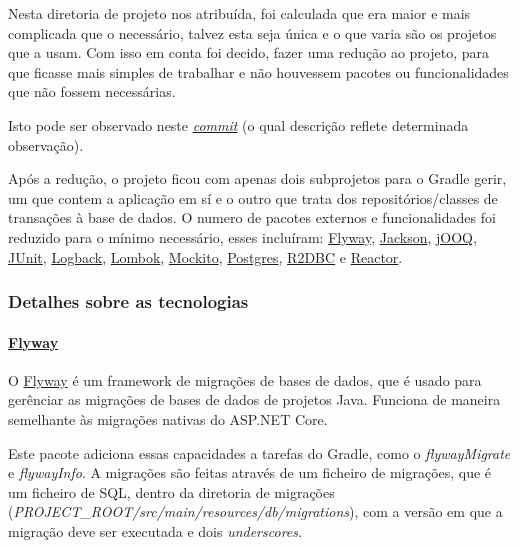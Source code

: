 Nesta diretoria de projeto nos atribuída, foi calculada que era maior e mais complicada que o necessário, talvez esta seja única e o que varia são os projetos que a usam. Com isso em conta foi decido, fazer uma redução ao projeto, para que ficasse mais simples de trabalhar e não houvessem pacotes ou funcionalidades que não fossem necessárias.

Isto pode ser observado neste \href{https://github.com/CatKinKitKat/MicronautJooqPostgresREST/commit/3c71d709599662436ae13cf9dcf609a5ca5464e3}{\textit{commit}} (o qual descrição reflete determinada observação).

Após a redução, o projeto ficou com apenas dois subprojetos para o Gradle gerir, um que contem a aplicação em sí e o outro que trata dos repositórios/classes de transações à base de dados. O numero de pacotes externos e funcionalidades foi reduzido para o mínimo necessário, esses incluíram: \href{https://flywaydb.org/}{Flyway}, \href{http://fasterxml.com/}{Jackson}, \href{https://www.jooq.org/}{jOOQ}, \href{https://junit.org/junit5/}{JUnit}, \href{https://logback.qos.ch/}{Logback}, \href{https://projectlombok.org/}{Lombok}, \href{https://site.mockito.org/}{Mockito}, \href{https://jdbc.postgresql.org/}{Postgres}, \href{https://r2dbc.io/}{R2DBC} e \href{https://projectreactor.io/}{Reactor}.

\subsubsection{Detalhes sobre as tecnologias}

\paragraph{\href{https://flywaydb.org/}{Flyway}\\}

O \href{https://flywaydb.org/}{Flyway} é um framework de migrações de bases de dados, que é usado para gerênciar as migrações de bases de dados de projetos Java. Funciona de maneira semelhante às migrações nativas do ASP.NET Core.\cite{flyway}

Este pacote adiciona essas capacidades a tarefas do Gradle, como o \textit{flywayMigrate} e \textit{flywayInfo}. A migrações são feitas através de um ficheiro de migrações, que é um ficheiro de SQL, dentro da diretoria de migrações (\textit{PROJECT\_ROOT/src/main/resources/db/migrations}), com a versão em que a migração deve ser executada e dois \textit{underscores}.

